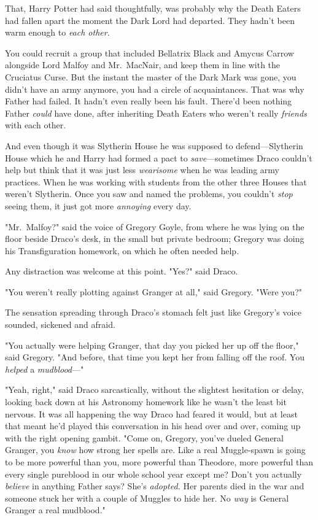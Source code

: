 That, Harry Potter had said thoughtfully, was probably why the Death Eaters had
fallen apart the moment the Dark Lord had departed. They hadn't been warm
enough to \emph{each other}.

You could recruit a group that included Bellatrix Black and Amycus Carrow
alongside Lord Malfoy and Mr.~MacNair, and keep them in line with the Cruciatus
Curse. But the instant the master of the Dark Mark was gone, you didn't have an
army anymore, you had a circle of acquaintances. That was why Father had
failed. It hadn't even really been his fault. There'd been nothing Father
\emph{could} have done, after inheriting Death Eaters who weren't really
\emph{friends} with each other.

And even though it was Slytherin House he was supposed to defend—Slytherin
House which he and Harry had formed a pact to \emph{save}—sometimes Draco
couldn't help but think that it was just less \emph{wearisome} when he was
leading army practices. When he was working with students from the other three
Houses that weren't Slytherin. Once you saw and named the problems, you
couldn't \emph{stop} seeing them, it just got more \emph{annoying} every day.

"Mr.~Malfoy?" said the voice of Gregory Goyle, from where he was lying on the
floor beside Draco's desk, in the small but private bedroom; Gregory was doing
his Transfiguration homework, on which he often needed help.

Any distraction was welcome at this point. "Yes?" said Draco.

"You weren't really plotting against Granger at all," said Gregory. "Were you?"

The sensation spreading through Draco's stomach felt just like Gregory's voice
sounded, sickened and afraid.

"You actually were helping Granger, that day you picked her up off the floor,"
said Gregory. "And before, that time you kept her from falling off the roof.
You \emph{helped} a \emph{mudblood}—"

"Yeah, right," said Draco sarcastically, without the slightest hesitation or
delay, looking back down at his Astronomy homework like he wasn't the least bit
nervous. It was all happening the way Draco had feared it would, but at least
that meant he'd played this conversation in his head over and over, coming up
with the right opening gambit. "Come on, Gregory, you've dueled General
Granger, you \emph{know} how strong her spells are. Like a real Muggle-spawn is
going to be more powerful than you, more powerful than Theodore, more powerful
than every single pureblood in our whole school year except me? Don't you
actually \emph{believe} in anything Father says? She's \emph{adopted.} Her
parents died in the war and someone stuck her with a couple of Muggles to hide
her. No \emph{way} is General Granger a real mudblood."

